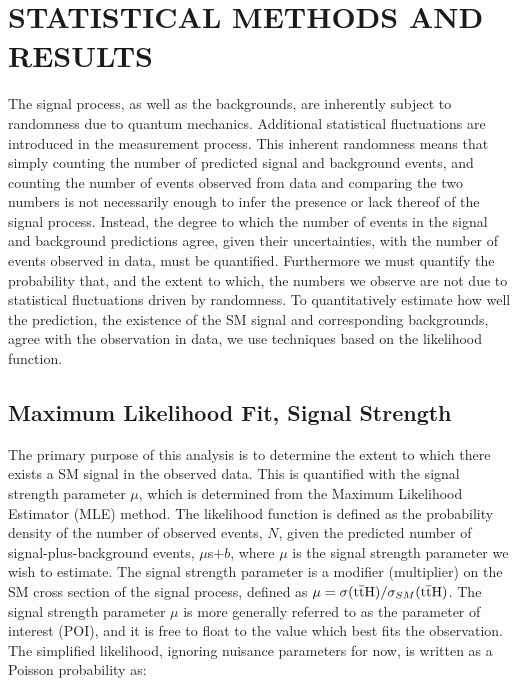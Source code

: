 %
%

\chapter{STATISTICAL METHODS AND RESULTS}
\label{chap:stats}
The \tth signal process, as well as the backgrounds, are inherently subject to randomness due to quantum mechanics.
Additional statistical fluctuations are introduced in the measurement process. This inherent randomness means that simply counting the number of predicted
signal and background events, and counting the number of events observed from data and comparing the two numbers is not necessarily enough to infer the presence or
lack thereof of the \tth signal process. Instead, the degree to which the
number of events in the signal and background predictions agree, given their uncertainties, with the number of events observed in data, must be quantified.
Furthermore we must quantify the probability that, and the extent to which, the numbers we observe are not due to statistical fluctuations driven by randomness. 
To quantitatively estimate how well the prediction, the existence of the SM \tth signal and corresponding backgrounds, agree with the observation in data,
we use techniques based on the likelihood function.

\section{Maximum Likelihood Fit, Signal Strength}
\label{sec:fit}
The primary purpose of this analysis is to determine the extent to which there exists a SM \tth signal in the observed data. This is quantified with the signal strength
parameter $\mu$, which is determined from the Maximum Likelihood Estimator (MLE) method. 
The likelihood function is defined as the probability density of the number of observed events, $N$, given the predicted number of signal-plus-background events, $\mu$s$ + b$,
where $\mu$ is the signal strength parameter we wish to estimate.
The signal strength parameter is a modifier (multiplier) on the SM cross section of the \tth signal process, defined as $\mu = \sigma(\mathrm{t}\overline{\mathrm{t}}\mathrm{H})/\sigma_{SM}(\mathrm{t}\overline{\mathrm{t}}\mathrm{H})$.
The signal strength parameter $\mu$ is more generally referred to as the parameter of interest (POI), and it is free to float to the value which best fits the observation.
The simplified likelihood, ignoring nuisance parameters for now, is written as a Poisson probability as:

